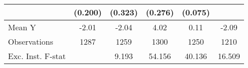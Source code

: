 {\begin{tabular}{l*{5}{c}}
            &     (0.200)         &     (0.323)         &     (0.276)         &     (0.075)         &                     \\
\midrule
Mean Y      &       -2.01         &       -2.04         &        4.02         &        0.11         &       -2.09         \\
Observations&        1287         &        1259         &        1300         &        1250         &        1210         \\
Exc. Inst. F-stat&                     &       9.193         &      54.156         &      40.136         &      16.509         \\
\bottomrule
\end{tabular}
}
